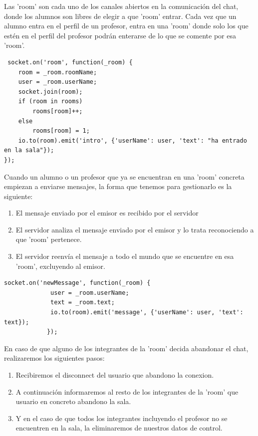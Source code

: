 \begin{itemize}
Las 'room' son cada uno de los canales abiertos en la comunicación del chat, donde los alumnos son libres de elegir a que 'room' entrar. Cada vez que un alumno entra en el perfil de un profesor, entra en una 'room' donde solo los que estén en el perfil del profesor podrán enterarse de lo que se comente por esa 'room'.

\begin{lstlisting}
 socket.on('room', function(_room) {
    room = _room.roomName;
	user = _room.userName;
    socket.join(room);
    if (room in rooms)
        rooms[room]++;
    else
        rooms[room] = 1;
    io.to(room).emit('intro', {'userName': user, 'text': "ha entrado en la sala"});
});

\end{lstlisting}

Cuando un alumno o un profesor que ya se encuentran en una 'room' concreta empiezan a enviarse mensajes, la forma que tenemos para gestionarlo es la siguiente:

\begin{enumerate}
    \item El mensaje enviado por el emisor es recibido por el servidor
    
    \item El servidor analiza el mensaje enviado por el emisor y lo trata reconociendo a que 'room' pertenece.
    
    \item El servidor reenvía el mensaje a todo el mundo que se encuentre en esa 'room', excluyendo al emisor.
\end{enumerate}

\begin{lstlisting}
socket.on('newMessage', function(_room) {
			 user = _room.userName;
			 text = _room.text;
			 io.to(room).emit('message', {'userName': user, 'text': text});
			});
\end{lstlisting}

En caso de que alguno de los integrantes de la 'room' decida abandonar el chat, realizaremos los siguientes pasos:

\begin{enumerate}
    \item Recibiremos el disconnect del usuario que abandono la conexion.
    
    \item A continuación informaremos al resto de los integrantes de la 'room' que usuario en concreto abandono la sala.
    
    \item Y en el caso de que todos los integrantes incluyendo el profesor no se encuentren en la sala, la eliminaremos de nuestros datos de control.
    

\end{enumerate}
\end{itemize}
